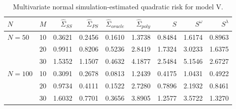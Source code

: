 \begin{table}[H]
\centering
\caption{Multivariate normal simulation-estimated quadratic risk  for model V.} 
\begin{tabular}{lrrrrrrrr}
 $N$ & $M$ &$\hat{\Sigma}_{SS}$& $\hat{\Sigma}_{PS}$ &$\hat{\Sigma}_{oracle}$& $\hat{\Sigma}_{poly}$ & $S$ &$S^\omega$& $S^\lambda$ \\ 
  \hline
   $N = 50$ & 10   & 0.3621 & 0.2456 & 0.1610 & 1.3738 & 0.8484 & 1.6174 & 0.8963 \\ 
     		& $20$ & 0.9911 & 0.8206 & 0.5236 & 2.8419 & 1.7324 & 3.0233 & 1.6375 \\ 
     		& $30$ & 1.5352 & 1.1507 & 0.4632 & 4.1877 & 2.5484 & 5.1546 & 2.6727 \\ 
  $N = 100$ & 10 & 0.3091 & 0.2678 & 0.0813 & 1.2439 & 0.4175 & 1.0431 & 0.4922 \\ 
     		 & $20$ & 0.9734 & 0.4111 & 0.1522 & 2.7280 & 0.7896 & 2.1932 & 0.8461 \\ 
     & $30$ & 1.6032 & 0.7701 & 0.3656 & 3.8905 & 1.2577 & 3.5722 & 1.3270 \\ 
   \hline
\end{tabular}
\label{table:simulation-1-quad-loss-sigma-5}
\end{table}
%


